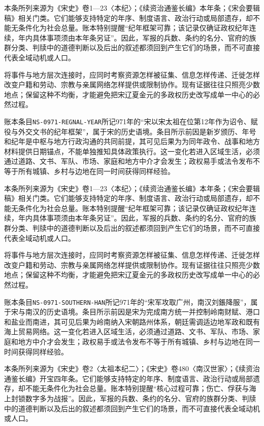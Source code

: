 本条所列来源为《宋史》卷1—23〈本纪〉；《续资治通鉴长编》本年条；《宋会要辑稿》相关门类。它们能够支持特定的年序、制度语言、政治行动或局部遗存，却不能无条件化为社会总量。账本特别提醒“纪年框架可靠；该记录仅确证政权纪年连续，年内具体事项须由本年条另证”。因此，军报的兵数、条约的名分、官府的族群分类、判牍中的道德判断以及后出的叙述都须回到产生它们的场景，而不可直接代表全域动机或人口。

将事件与地方层次连接时，应同时考察资源怎样被征集、信息怎样传递、迁徙怎样改变户籍和劳动、宗教与亲属网络怎样提供或限制协作。现有证据往往只照亮少数地点；保留这种不均衡，才能避免把宋辽夏金元的多政权历史改写成单一中心的必然过程。

账本条目\texttt{NS-0971-REGNAL-YEAR}所记971年的“宋以宋太祖在位第12年作为诏令、赋役与外交文书的纪年框架”，属于宋的历史语境。条目所示前因是新岁颁历、年号和纪年是中枢与地方行政沟通的共同前提，其可见后果为为同年政令、战事和地方材料提供日期锚点，不能单独推知具体政策执行。这一变化若进入区域生活，必须通过道路、文书、军队、市场、家庭和地方中介才会发生；政权易手或法令发布不等于所有城镇、乡村与边地在同一时间获得同样经验。

本条所列来源为《宋史》卷1—23〈本纪〉；《续资治通鉴长编》本年条；《宋会要辑稿》相关门类。它们能够支持特定的年序、制度语言、政治行动或局部遗存，却不能无条件化为社会总量。账本特别提醒“纪年框架可靠；该记录仅确证政权纪年连续，年内具体事项须由本年条另证”。因此，军报的兵数、条约的名分、官府的族群分类、判牍中的道德判断以及后出的叙述都须回到产生它们的场景，而不可直接代表全域动机或人口。

将事件与地方层次连接时，应同时考察资源怎样被征集、信息怎样传递、迁徙怎样改变户籍和劳动、宗教与亲属网络怎样提供或限制协作。现有证据往往只照亮少数地点；保留这种不均衡，才能避免把宋辽夏金元的多政权历史改写成单一中心的必然过程。

账本条目\texttt{NS-0971-SOUTHERN-HAN}所记971年的“宋军攻取广州，南汉刘鋹降服”，属于宋与南汉的历史语境。条目所示前因是宋为完成南方统一并控制岭南财赋、港口和盐业而南进，其可见后果为岭南纳入宋朝路州体系，朝廷需调适边地军政和既有海上贸易网络。这一变化若进入区域生活，必须通过道路、文书、军队、市场、家庭和地方中介才会发生；政权易手或法令发布不等于所有城镇、乡村与边地在同一时间获得同样经验。

本条所列来源为《宋史》卷2〈太祖本纪二〉；《宋史》卷480〈南汉世家〉；《续资治通鉴长编》开宝四年条。它们能够支持特定的年序、制度语言、政治行动或局部遗存，却不能无条件化为社会总量。账本特别提醒“核心过程可靠；伤亡、俘获与海上封锁数字多为战报”。因此，军报的兵数、条约的名分、官府的族群分类、判牍中的道德判断以及后出的叙述都须回到产生它们的场景，而不可直接代表全域动机或人口。

